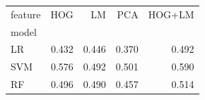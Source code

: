 \begin{tabular}{lrrrr}
\toprule
feature & HOG & LM & PCA & HOG+LM \\
model &  &  &  &  \\
\midrule
LR & 0.432 & 0.446 & 0.370 & 0.492 \\
SVM & 0.576 & 0.492 & 0.501 & 0.590 \\
RF & 0.496 & 0.490 & 0.457 & 0.514 \\
\bottomrule
\end{tabular}
